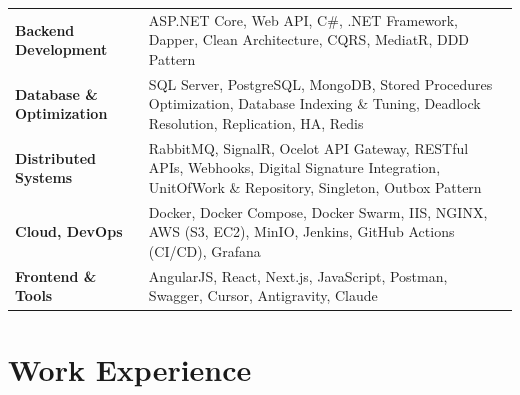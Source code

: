 \documentclass[a4paper,10pt]{article}
\begin{document}
\begin{tabularx}{\linewidth}{@{}>{\bfseries\color{darktext}}l X@{}}
    Backend Development & ASP.NET Core, Web API, C\#, .NET Framework, Dapper, Clean Architecture, CQRS, MediatR, DDD Pattern \\[0.5em]
    Database \& Optimization & SQL Server, PostgreSQL, MongoDB, Stored Procedures Optimization, Database Indexing \& Tuning, Deadlock Resolution, Replication, HA, Redis \\[0.5em]
    Distributed Systems & RabbitMQ, SignalR, Ocelot API Gateway, RESTful APIs, Webhooks, Digital Signature Integration, UnitOfWork \& Repository, Singleton, Outbox Pattern \\[0.5em]
    Cloud, DevOps & Docker, Docker Compose, Docker Swarm, IIS, NGINX, AWS (S3, EC2), MinIO, Jenkins, GitHub Actions (CI/CD), Grafana \\[0.5em]
    Frontend \& Tools & AngularJS, React, Next.js, JavaScript, Postman, Swagger, Cursor, Antigravity, Claude \\
\end{tabularx}

\section{Work Experience}
\end{document}
